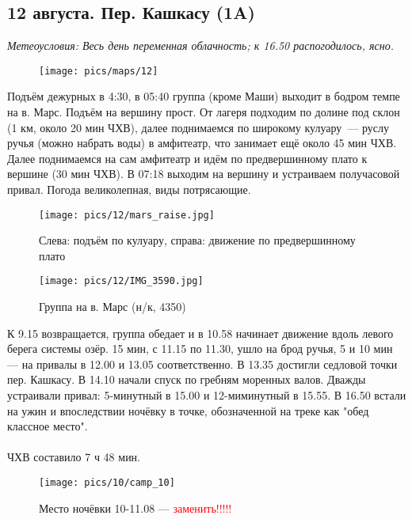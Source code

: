 \subsection{12 августа. Пер. Кашкасу (1A)}
\textit{Метеоусловия: Весь день переменная облачность; к 16.50 распогодилось, ясно.}

\begin{figure}[h!]
	\centering
	\texttt{[image: pics/maps/12]}
	\label{fig:12}
\end{figure}

Подъём дежурных в 4:30, в 05:40 группа (кроме Маши) выходит в бодром темпе на в. Марс. Подъём на вершину прост. От лагеря подходим по долине под склон (1 км, около 20 мин ЧХВ), далее поднимаемся по широкому кулуару~--- руслу ручья (можно набрать воды) в амфитеатр, что занимает ещё около 45 мин ЧХВ. Далее поднимаемся на сам амфитеатр и идём по предвершинному плато к вершине (30 мин ЧХВ). В 07:18 выходим на вершину и устраиваем получасовой привал. Погода великолепная, виды потрясающие.


\begin{figure}[h!]
	\centering
	\texttt{[image: pics/12/mars\_raise.jpg]}
	\caption{Слева: подъём по кулуару, справа: движение по предвершинному плато}
	\label{fig:mars_raise.jpg}
\end{figure}

\begin{figure}[h!]
	\centering
	\texttt{[image: pics/12/IMG\_3590.jpg]}
	\caption{Группа на в. Марс (н/к, 4350)}
	\label{fig:IMG_3590.jpg}
\end{figure}


К 9.15 возвращается, группа обедает и в 10.58 начинает движение вдоль левого берега системы озёр. 15 мин, с 11.15 по 11.30, ушло на брод ручья,
5 и 10 мин — на привалы в 12.00 и 13.05 соответственно. В 13.35 достигли седловой точки пер. Кашкасу. В 14.10 начали спуск по гребням 
моренных валов. Дважды устраивали привал: 5-минутный в 15.00 и 12-миминутный в 15.55. В 16.50 встали на ужин и впоследствии ночёвку в точке, обозначенной на треке как 
"обед классное место". 
\\\\ ЧХВ составило 7 ч 48 мин.


\begin{figure}[h!]
	\centering
		\texttt{[image: pics/10/camp\_10]}
	\caption{Место ночёвки 10-11.08 — \textcolor{red}{заменить!!!!!}}
	\label{fig:camp_10}
\end{figure}

\clearpage
